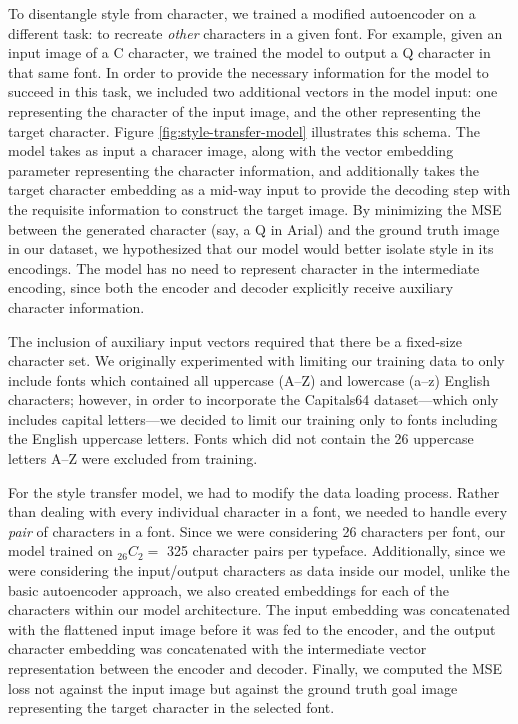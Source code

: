 To disentangle style from character, we trained a modified autoencoder on a different task: to recreate \textit{other} characters in a given font. For example, given an input image of a C character, we trained the model to output a Q character in that same font. In order to provide the necessary information for the model to succeed in this task, we included two additional vectors in the model input: one representing the character of the input image, and the other representing the target character. Figure \ref{fig:style-transfer-model} illustrates this schema. The model takes as input a characer image, along with the vector embedding parameter representing the character information, and additionally takes the target character embedding as a mid-way input to provide the decoding step with the requisite information to construct the target image. By minimizing the MSE between the generated character (say, a { Q} in Arial) and the ground truth image in our dataset, we hypothesized that our model would better isolate style in its encodings. The model has no need to represent character in the intermediate encoding, since both the encoder and decoder explicitly receive auxiliary character information. 

The inclusion of auxiliary input vectors required that there be a fixed-size character set. We originally experimented with limiting our training data to only include fonts which contained all uppercase (A--Z) and lowercase (a--z) English characters; however, in order to incorporate the Capitals64 dataset---which only includes capital letters---we decided to limit our training only to fonts including the English uppercase letters. Fonts which did not contain the 26 uppercase letters A--Z were excluded from training.

For the style transfer model, we had to modify the data loading process. Rather than dealing with every individual character in a font, we needed to handle every \textit{pair} of characters in a font. Since we were considering 26 characters per font, our model trained on ${}_{26}C_2 =$ 325 character pairs per typeface. Additionally, since we were considering the input/output characters as data inside our model, unlike the basic autoencoder approach, we also created embeddings for each of the characters within our model architecture. The input embedding was concatenated with the flattened input image before it was fed to the encoder, and the output character embedding was concatenated with the intermediate vector representation between the encoder and decoder. Finally, we computed the MSE loss not against the input image but against the ground truth goal image representing the target character in the selected font.

